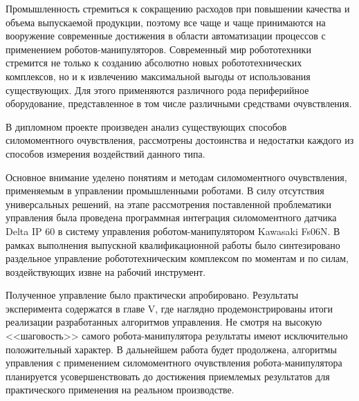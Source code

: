 \documentclass[a4paper,14pt,russian]{extreport} \usepackage{extsizes}
\begin{document}
	Промышленность стремиться к сокращению расходов при повышении качества и объема выпускаемой продукции, поэтому все чаще и чаще принимаются на вооружение современные достижения в области автоматизации процессов с применением роботов-манипуляторов. Современный мир робототехники стремится не только к созданию абсолютно новых робототехнических комплексов, но и к извлечению максимальной выгоды от использования существующих. Для этого применяются различного рода периферийное оборудование, представленное в том числе различными средствами очувствления.
	
	В дипломном проекте произведен анализ существующих способов силомоментного очувствления, рассмотрены достоинства и недостатки каждого из способов измерения воздействий данного типа. 
	
	Основное внимание уделено понятиям и методам силомоментного очувствления, применяемым в управлении промышленными роботами. В силу отсутствия универсальных решений, на этапе рассмотрения поставленной проблематики управления была проведена программная интеграция силомоментного датчика Delta IP 60 в систему управления роботом-манипулятором Kawasaki Fs06N. В рамках выполнения выпускной квалификационной работы  было синтезировано раздельное управление робототехническим комплексом по моментам и по силам, воздействующих извне на рабочий инструмент. 
	
	Полученное управление было практически апробировано. Результаты эксперимента содержатся в главе V, где наглядно продемонстрированы итоги реализации разработанных алгоритмов управления. Не смотря на высокую <<шаговость>> самого робота-манипулятора результаты имеют исключительно положительный характер. В дальнейшем работа будет продолжена, алгоритмы  управления с применением силомоментного очувствления робота-манипулятора планируется усовершенствовать до достижения приемлемых результатов для практического применения на реальном производстве.
	
\end{document}
